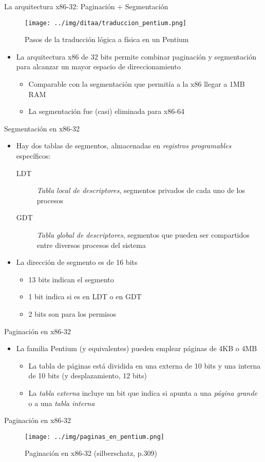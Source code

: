 \documentclass[presentation]{beamer}
\begin{document}
\begin{frame}[label={sec:org916d817}]{La arquitectura x86-32: Paginación + Segmentación}
\begin{figure}[htbp]
\centering
\texttt{[image: ../img/ditaa/traduccion\_pentium.png]}
\caption{Pasos de la traducción lógica a física en un Pentium}
\end{figure}
\begin{itemize}
\item La arquitectura x86 de 32 bits permite combinar paginación y
segmentación para alcanzar un mayor espacio de direccionamiento
\begin{itemize}
\item Comparable con la segmentación que permitía a la x86 llegar a 1MB RAM
\item La segmentación fue (casi) eliminada para x86-64
\end{itemize}
\end{itemize}
\end{frame}

\begin{frame}[label={sec:orge7f12c4}]{Segmentación en x86-32}
\begin{itemize}
\item Hay dos tablas de segmentos, almacenadas en \emph{registros
programables} específicos:
\begin{description}
\item[{LDT}] \emph{Tabla local de descriptores}, segmentos privados de cada
uno de los procesos
\item[{GDT}] \emph{Tabla global de descriptores}, segmentos que pueden ser
compartidos entre diversos procesos del sistema
\end{description}
\item La dirección de segmento es de 16 bits
\begin{itemize}
\item 13 bits indican el segmento
\item 1 bit indica si es en LDT o en GDT
\item 2 bits son para los permisos
\end{itemize}
\end{itemize}
\end{frame}

\begin{frame}[label={sec:org4b3a7ff}]{Paginación en x86-32}
\begin{itemize}
\item La familia Pentium (y equivalentes) pueden emplear páginas de 4KB o
4MB
\begin{itemize}
\item La tabla de páginas está dividida en una externa de 10 bits y una
interna de 10 bits (y desplazamiento, 12 bits)
\item La \emph{tabla externa} incluye un bit que indica si apunta a una
\emph{página grande} o a una \emph{tabla interna}
\end{itemize}
\end{itemize}
\end{frame}

\begin{frame}[label={sec:orgcc6b91b}]{Paginación en x86-32}
\begin{figure}[htbp]
\centering
\texttt{[image: ../img/paginas\_en\_pentium.png]}
\caption{Paginación en x86-32 (silberschatz, p.309)}
\end{figure}
\end{frame}
\end{document}
